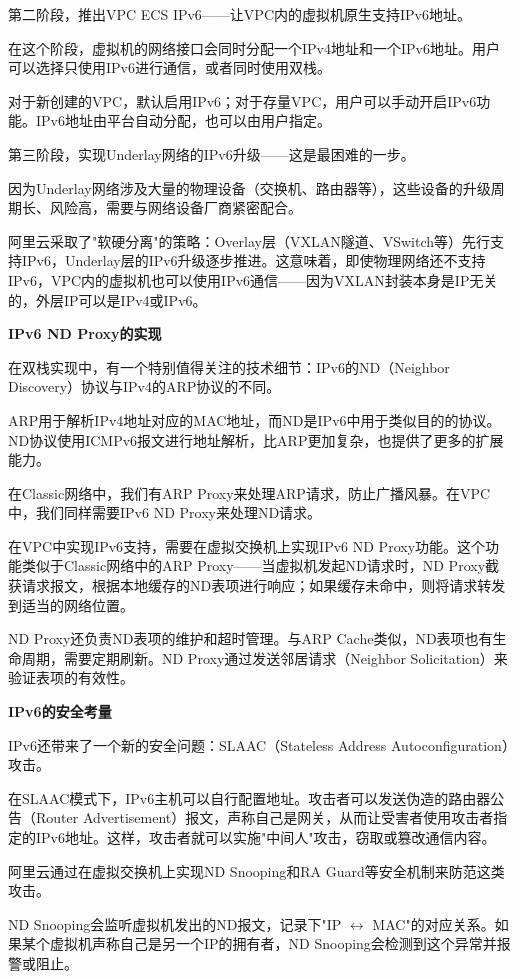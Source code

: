 第二阶段，推出VPC ECS IPv6——让VPC内的虚拟机原生支持IPv6地址。

在这个阶段，虚拟机的网络接口会同时分配一个IPv4地址和一个IPv6地址。用户可以选择只使用IPv6进行通信，或者同时使用双栈。

对于新创建的VPC，默认启用IPv6；对于存量VPC，用户可以手动开启IPv6功能。IPv6地址由平台自动分配，也可以由用户指定。

第三阶段，实现Underlay网络的IPv6升级——这是最困难的一步。

因为Underlay网络涉及大量的物理设备（交换机、路由器等），这些设备的升级周期长、风险高，需要与网络设备厂商紧密配合。

阿里云采取了"软硬分离"的策略：Overlay层（VXLAN隧道、VSwitch等）先行支持IPv6，Underlay层的IPv6升级逐步推进。这意味着，即使物理网络还不支持IPv6，VPC内的虚拟机也可以使用IPv6通信——因为VXLAN封装本身是IP无关的，外层IP可以是IPv4或IPv6。

\textbf{IPv6 ND Proxy的实现}

在双栈实现中，有一个特别值得关注的技术细节：IPv6的ND（Neighbor Discovery）协议与IPv4的ARP协议的不同。

ARP用于解析IPv4地址对应的MAC地址，而ND是IPv6中用于类似目的的协议。ND协议使用ICMPv6报文进行地址解析，比ARP更加复杂，也提供了更多的扩展能力。

在Classic网络中，我们有ARP Proxy来处理ARP请求，防止广播风暴。在VPC中，我们同样需要IPv6 ND Proxy来处理ND请求。

在VPC中实现IPv6支持，需要在虚拟交换机上实现IPv6 ND Proxy功能。这个功能类似于Classic网络中的ARP Proxy——当虚拟机发起ND请求时，ND Proxy截获请求报文，根据本地缓存的ND表项进行响应；如果缓存未命中，则将请求转发到适当的网络位置。

ND Proxy还负责ND表项的维护和超时管理。与ARP Cache类似，ND表项也有生命周期，需要定期刷新。ND Proxy通过发送邻居请求（Neighbor Solicitation）来验证表项的有效性。

\textbf{IPv6的安全考量}

IPv6还带来了一个新的安全问题：SLAAC（Stateless Address Autoconfiguration）攻击。

在SLAAC模式下，IPv6主机可以自行配置地址。攻击者可以发送伪造的路由器公告（Router Advertisement）报文，声称自己是网关，从而让受害者使用攻击者指定的IPv6地址。这样，攻击者就可以实施"中间人"攻击，窃取或篡改通信内容。

阿里云通过在虚拟交换机上实现ND Snooping和RA Guard等安全机制来防范这类攻击。

ND Snooping会监听虚拟机发出的ND报文，记录下"IP $\leftrightarrow$ MAC"的对应关系。如果某个虚拟机声称自己是另一个IP的拥有者，ND Snooping会检测到这个异常并报警或阻止。

